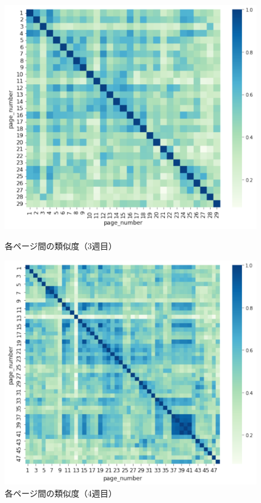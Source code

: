 \documentclass[a4paper,12pt]{ltjsreport}
\begin{document}
\begin{figure}[tbp]
  \begin{minipage}[b]{0.5\linewidth}
    \centering
    \includegraphics[scale=0.35]{3cos.pdf}
    \caption{各ページ間の類似度（3週目）}
    \label{fig:3cos}
  \end{minipage}
  \begin{minipage}[b]{0.5\linewidth}
    \centering
    \includegraphics[scale=0.35]{4cos.pdf}
    \caption{各ページ間の類似度（4週目）}
    \label{fig:4cos}
  \end{minipage}
\end{figure}
\end{document}
